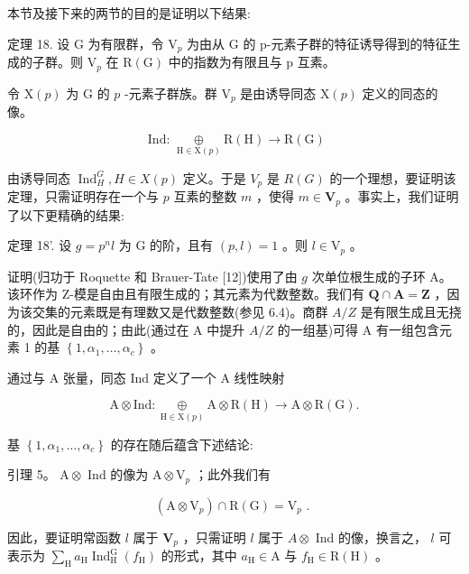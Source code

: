 \documentclass[10pt]{article}
\begin{document}
本节及接下来的两节的目的是证明以下结果:

定理 18. 设 \(\mathrm{G}\) 为有限群，令 \({\mathrm{V}}_{p}\) 为由从 \(\mathrm{G}\) 的 p-元素子群的特征诱导得到的特征生成的子群。则 \({\mathrm{V}}_{p}\) 在 \(\mathrm{R}\left( \mathrm{G}\right)\) 中的指数为有限且与 p 互素。

令 \(\mathrm{X}\left( p\right)\) 为 \(\mathrm{G}\) 的 \(p\) -元素子群族。群 \({\mathrm{V}}_{p}\) 是由诱导同态 \(\mathrm{X}\left( p\right)\) 定义的同态的像。

\[
\text{ Ind: }\mathop{\oplus }\limits_{{\mathrm{H} \in  \mathrm{X}\left( p\right) }}\mathrm{R}\left( \mathrm{H}\right)  \rightarrow  \mathrm{R}\left( \mathrm{G}\right)
\]

由诱导同态 \({\operatorname{Ind}}_{H}^{G},H \in  X\left( p\right)\) 定义。于是 \({V}_{p}\) 是 \(R\left( G\right)\) 的一个理想，要证明该定理，只需证明存在一个与 \(p\) 互素的整数 \(m\) ，使得 \(m \in  {\mathbf{V}}_{p}\) 。事实上，我们证明了以下更精确的结果:

定理 18’. 设 \(g = {p}^{n}l\) 为 \(\mathrm{G}\) 的阶，且有 \(\left( {p,l}\right)  = 1\) 。则 \(l \in  {\mathrm{V}}_{p}\) 。

证明(归功于 Roquette 和 Brauer-Tate [12])使用了由 \(g\) 次单位根生成的子环 A。该环作为 Z-模是自由且有限生成的；其元素为代数整数。我们有 \(\mathbf{Q} \cap  \mathbf{A} = \mathbf{Z}\) ，因为该交集的元素既是有理数又是代数整数(参见 6.4)。商群 \(A/Z\) 是有限生成且无挠的，因此是自由的；由此(通过在 A 中提升 \(A/Z\) 的一组基)可得 A 有一组包含元素 1 的基 \(\left\{  {1,{\alpha }_{1},\ldots ,{\alpha }_{c}}\right\}\) 。

通过与 A 张量，同态 Ind 定义了一个 A 线性映射

\[
\mathrm{A} \otimes  \mathrm{{Ind}} : \underset{\mathrm{H} \in  \mathrm{X}\left( p\right) }{ \oplus  }\mathrm{A} \otimes  \mathrm{R}\left( \mathrm{H}\right)  \rightarrow  \mathrm{A} \otimes  \mathrm{R}\left( \mathrm{G}\right) .
\]

基 \(\left\{  {1,{\alpha }_{1},\ldots ,{\alpha }_{c}}\right\}\) 的存在随后蕴含下述结论:

引理 5。 \(\mathrm{A} \otimes\) Ind 的像为 \(\mathrm{A} \otimes  {\mathrm{V}}_{p}\) ；此外我们有

\[
\left( {\mathrm{A} \otimes  {\mathrm{V}}_{p}}\right)  \cap  \mathrm{R}\left( \mathrm{G}\right)  = {\mathrm{V}}_{p}\text{ . }
\]

因此，要证明常函数 \(l\) 属于 \({\mathbf{V}}_{p}\) ，只需证明 \(l\) 属于 \(A \otimes\) Ind 的像，换言之， \(l\) 可表示为 \(\mathop{\sum }\limits_{\mathrm{H}}{a}_{\mathrm{H}}{\operatorname{Ind}}_{\mathrm{H}}^{\mathrm{G}}\left( {f}_{\mathrm{H}}\right)\) 的形式，其中 \({a}_{\mathrm{H}} \in  \mathrm{A}\) 与 \({f}_{\mathrm{H}} \in  \mathrm{R}\left( \mathrm{H}\right)\) 。
\end{document}
